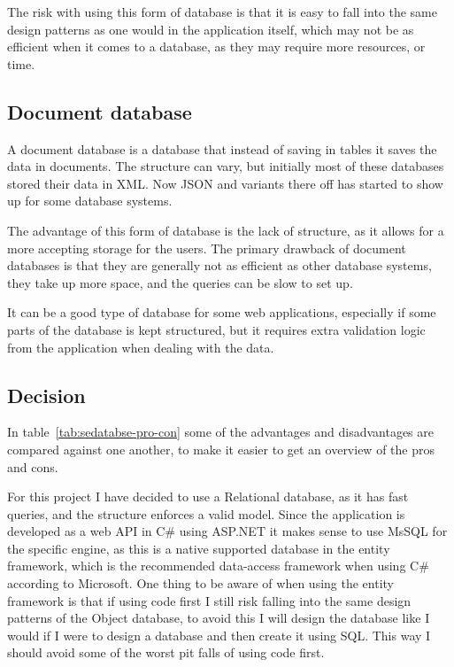 The risk with using this form of database is that it is easy to fall into the
same design patterns as one would in the application itself, which may not be as
efficient when it comes to a database, as they may require more resources, or
time\cite{ibm:choosing_dbms}. 

\subsection{Document database}
\label{sub:Document database}
A document database is a database that instead of saving in tables it saves the
data in documents. The structure can vary, but initially most of these databases
stored their data in XML\cite{ibm:choosing_dbms}. Now JSON and variants there
off has started to show up for some database systems. 

The advantage of this form of database is the lack of structure, as it allows
for a more accepting storage for the users. The primary drawback of document
databases is that they are generally not as efficient as other database systems,
they take up more space, and the queries can be slow to set
up\cite{ibm:choosing_dbms}. 

It can be a good type of database for some web applications, especially if some
parts of the database is kept structured, but it requires extra validation logic
from the application when dealing with the data. 


\subsection{Decision }
\label{sub:database_decision}
In table~\ref{tab:sedatabse-pro-con} some of the advantages and disadvantages
are compared against one another, to make it easier to get an overview of the
pros and cons. 

For this project I have decided to use a Relational database, as it has fast
queries, and the structure enforces a valid model. Since the application is
developed as a web API in C\# using ASP.NET it makes sense to use MsSQL for the
specific engine, as this is a native supported database in the entity
framework, which is the recommended data-access framework when using C\#
according to Microsoft\cite{entity:microsoft}. One thing to be aware of when
using the entity framework is that if using code first I still risk falling into
the same design patterns of the Object database, to avoid this I will design the
database like I would if I were to design a database and then create it
using SQL. This way I should avoid some of the worst pit falls of using code
first.

